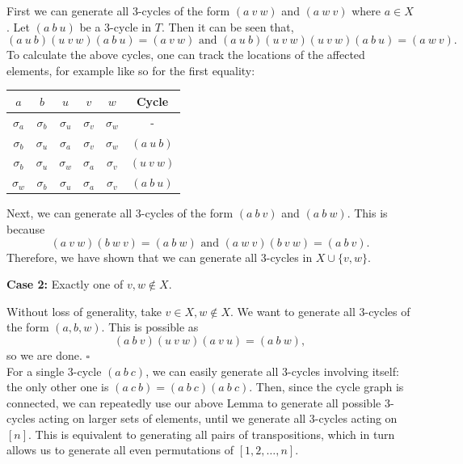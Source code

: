 \documentclass{article}
\begin{document}
    First we can generate all 3-cycles of the form $(a\ v\ w)$ and $(a\ w\ v)$ where $a \in X$. Let $(a\ b\ u)$ be a 3-cycle in $T$. Then it can be seen that, $$(a\ u\ b)(u\ v\ w)(a\ b\ u) = (a\ v\ w) \text{ and } (a\ u\ b)(u\ v\ w)(u\ v\ w)(a\ b\ u) = (a\ w\ v).$$
    To calculate the above cycles, one can track the locations of the affected elements, for example like so for the first equality:
    \begin{center}
        \begin{tabular}{|c c c c c |c|} 
            \hline
            $a$ & $b$ & $u$ & $v$ & $w$ & Cycle\\ 
            \hline\hline
            $\sigma_a$ & $\sigma_b$ & $\sigma_u$ & $\sigma_v$ & $\sigma_w$ & - \\ 
            \hline
            $\sigma_b$ & $\sigma_u$ & $\sigma_a$ & $\sigma_v$ & $\sigma_w$ & $(a\ u\ b)$ \\ 
            \hline
            $\sigma_b$ & $\sigma_u$ & $\sigma_w$ & $\sigma_a$ & $\sigma_v$ & $(u\ v\ w)$\\ 
            \hline
            $\sigma_w$ & $\sigma_b$ & $\sigma_u$ & $\sigma_a$ & $\sigma_v$ & $(a\ b\ u)$\\ 
            \hline
        \end{tabular}
    \end{center}
    Next, we can generate all 3-cycles of the form $(a\ b\ v)$ and $(a\ b\ w)$. This is because $$(a\ v\ w)(b\ w\ v) = (a\ b\ w) \text{ and } (a\ w\ v)(b\ v\ w) = (a\ b\ v).$$
    Therefore, we have shown that we can generate all 3-cycles in $X \cup \{v, w\}$.

    \textbf{Case 2:} Exactly one of $v, w\notin X$.

    Without loss of generality, take $v\in X, w\notin X$. We want to generate all 3-cycles of the form $(a, b, w)$. This is possible as $$(a\ b\ v)(u\ v\ w)(a\ v\ u) = (a\ b\ w),$$ so we are done. $\square$ \\
    
    For a single 3-cycle $(a\ b\ c)$, we can easily generate all 3-cycles involving itself: the only other one is $(a\ c\ b) = (a\ b\ c)(a\ b\ c)$. Then, since the cycle graph is connected, we can repeatedly use our above Lemma to generate all possible 3-cycles acting on larger sets of elements, until we generate all 3-cycles acting on $[n]$. This is equivalent to generating all pairs of transpositions, which in turn allows us to generate all even permutations of $[1, 2, \dots, n]$. 
    
\end{document}
